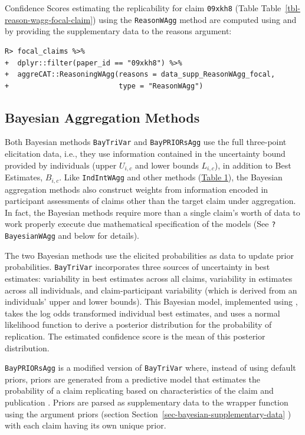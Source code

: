 \documentclass[article]{jss}
\newcommand{\fct}[1]{\code{#1()}}
\begin{document}
Confidence Scores estimating the replicability for claim \texttt{09xkh8}
(Table Table~\ref{tbl-reason-wagg-focal-claim}) using the
\texttt{ReasonWAgg} method are computed using \fct{ReasoningWAgg} and by
providing the supplementary data to the {reasons} argument:

\begin{verbatim}
R> focal_claims %>% 
+  dplyr::filter(paper_id == "09xkh8") %>% 
+  aggreCAT::ReasoningWAgg(reasons = data_supp_ReasonWAgg_focal,
+                          type = "ReasonWAgg")
\end{verbatim}

\hypertarget{bayesian-aggregation-methods}{%
\subsection{Bayesian Aggregation
Methods}\label{bayesian-aggregation-methods}}

Both Bayesian methods \texttt{BayTriVar} and \texttt{BayPRIORsAgg} use
the full three-point elicitation data, i.e., they use information
contained in the uncertainty bound provided by individuals (upper
\({U}_{i,c}\) and lower bounds \({L}_{i,c}\)), in addition to Best
Estimates, \(B_{i,c}\). Like \texttt{IndIntWAgg} and other methods
(\protect\hyperlink{table1}{Table 1}), the Bayesian aggregation methods
also construct weights from information encoded in participant
assessments of claims other than the target claim under aggregation. In
fact, the Bayesian methods require more than a single claim's worth of
data to work properly execute due mathematical specification of the
models (See \texttt{?BayesianWAgg} and below for details).

The two Bayesian methods use the elicited probabilities as data to
update prior probabilities. \texttt{BayTriVar} incorporates three
sources of uncertainty in best estimates: variability in best estimates
across all claims, variability in estimates across all individuals, and
claim-participant variability (which is derived from an individuals'
upper and lower bounds). This Bayesian model, implemented using
\citep{R2JAGS}, takes the log odds transformed individual
best estimates, and uses a normal likelihood function to derive a
posterior distribution for the probability of replication. The estimated
confidence score is the mean of this posterior distribution.

\texttt{BayPRIORsAgg} is a modified version of \texttt{BayTriVar} where,
instead of using default priors, priors are generated from a predictive
model that estimates the probability of a claim replicating based on
characteristics of the claim and publication \citep{Gould2021a}. Priors
are parsed as supplementary data to the wrapper function
\fct{BayesianWAgg} using the argument {priors} (section
Section~\ref{sec-bayesian-supplementary-data} ) with each claim having
its own unique prior.
\end{document}
